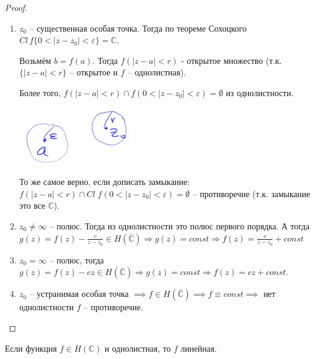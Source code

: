 \begin{proof}

    \begin{enumerate}
        \item {
            $z_0$ -- существенная особая точка. Тогда по теореме Сохоцкого
            $Cl \, f \{ 0 < |z - z_0| < \varepsilon \} = \mathbb{C}$.

            Возьмём $b = f(a)$. Тогда $f(|z - a| < r)$ - открытое множество (т.к. $\{|z-a| < r\}$ -- открытое и $f$ -- однолистная).

            Более того, $f(|z - a| < r) \cap f(0 < |z - z_0| < \varepsilon) = \emptyset$ из однолистности.


            \begin{center}
                \includegraphics[width=5    cm]{assets/04-functions-of-complex-variables/fractional-linear-functions.png}
            \end{center}

            То же самое верно, если дописать замыкание: $f(|z - a| < r) \cap Cl \; f(0 < |z - z_0| < \varepsilon) = \emptyset$ --  противоречие (т.к. замыкание это все $\mathbb{C}$).
        }
        \item {
            $z_0 \neq \infty$ -- полюс. Тогда из однолистности это полюс первого порядка. А тогда
            $g(z) = f(z) - \frac{c}{z - z_0} \in H(\bar{\mathbb{C}}) \Rightarrow g(z) = const \Rightarrow f(z) = \frac{c}{z - z_0} + const$
        }
        \item {
            $z_0 = \infty$ -- полюс, тогда $g(z) = f(z) - cz \in H(\bar{\mathbb{C}}) \Rightarrow g(z) = const \Rightarrow f(z) = cz + const$.
        }
        \item {
            $z_0$ -- устранимая особая точка $\implies f \in H(\bar{\mathbb{C}}) \implies f \equiv const \implies$ нет однолистности $f$ -- противоречие.
        }
    \end{enumerate}
\end{proof}

\begin{consequence}
    Если функция $f \in H(\mathbb{C})$ и однолистная, то $f$ линейная.
\end{consequence}

